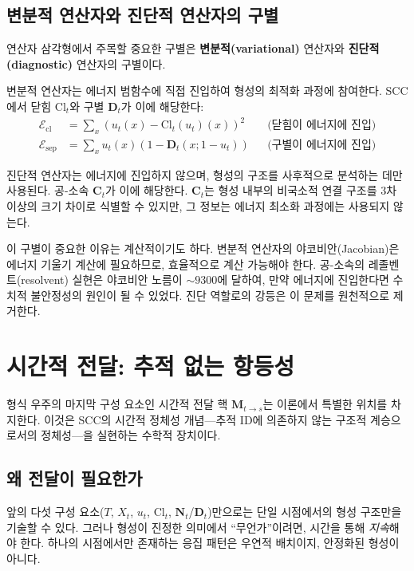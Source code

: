 \subsection{변분적 연산자와 진단적 연산자의 구별}

연산자 삼각형에서 주목할 중요한 구별은 \textbf{변분적(variational)} 연산자와 \textbf{진단적(diagnostic)} 연산자의 구별이다.

변분적 연산자는 에너지 범함수에 직접 진입하여 형성의 최적화 과정에 참여한다. SCC에서 닫힘 $\mathrm{Cl}_t$와 구별 $\mathbf{D}_t$가 이에 해당한다:
\begin{align}
    \mathcal{E}_{\mathrm{cl}} &= \sum_x (u_t(x) - \mathrm{Cl}_t(u_t)(x))^2 & &\text{(닫힘이 에너지에 진입)} \label{eq:ecl-uses-cl} \\
    \mathcal{E}_{\mathrm{sep}} &= \sum_x u_t(x)(1 - \mathbf{D}_t(x; 1-u_t)) & &\text{(구별이 에너지에 진입)} \label{eq:esep-uses-d}
\end{align}

진단적 연산자는 에너지에 진입하지 않으며, 형성의 구조를 사후적으로 분석하는 데만 사용된다. 공-소속 $\mathbf{C}_t$가 이에 해당한다. $\mathbf{C}_t$는 형성 내부의 비국소적 연결 구조를 3차 이상의 크기 차이로 식별할 수 있지만, 그 정보는 에너지 최소화 과정에는 사용되지 않는다.

이 구별이 중요한 이유는 계산적이기도 하다. 변분적 연산자의 야코비안(Jacobian)은 에너지 기울기 계산에 필요하므로, 효율적으로 계산 가능해야 한다. 공-소속의 레졸벤트(resolvent) 실현은 야코비안 노름이 $\sim 9300$에 달하여, 만약 에너지에 진입한다면 수치적 불안정성의 원인이 될 수 있었다. 진단 역할로의 강등은 이 문제를 원천적으로 제거한다.


\section{시간적 전달: 추적 없는 항등성}
\label{sec:temporal-transport}

형식 우주의 마지막 구성 요소인 시간적 전달 핵 $\mathbf{M}_{t \to s}$는 이론에서 특별한 위치를 차지한다. 이것은 SCC의 시간적 정체성 개념---추적 ID에 의존하지 않는 구조적 계승으로서의 정체성---을 실현하는 수학적 장치이다.


\subsection{왜 전달이 필요한가}

앞의 다섯 구성 요소($T$, $X_t$, $u_t$, $\mathrm{Cl}_t$, $\mathbf{N}_t$/$\mathbf{D}_t$)만으로는 단일 시점에서의 형성 구조만을 기술할 수 있다. 그러나 형성이 진정한 의미에서 ``무언가''이려면, 시간을 통해 \emph{지속}해야 한다. 하나의 시점에서만 존재하는 응집 패턴은 우연적 배치이지, 안정화된 형성이 아니다.

